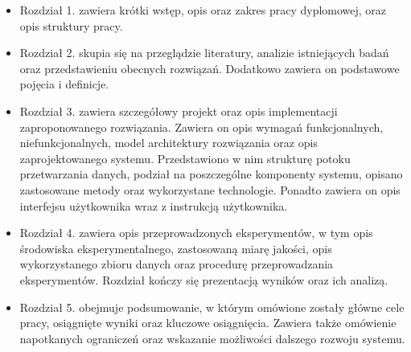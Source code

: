         \begin{itemize}
            \item {
                Rozdział 1. zawiera krótki wstęp, opis oraz zakres pracy dyplomowej, oraz opis struktury pracy.
            }
            \item {
                Rozdział 2. skupia się na przeglądzie literatury, analizie istniejących badań oraz przedstawieniu obecnych rozwiązań. Dodatkowo zawiera on podstawowe pojęcia i definicje.
            }
            \item {
                Rozdział 3. zawiera szczegółowy projekt oraz opis implementacji zaproponowanego rozwiązania. Zawiera on opis wymagań funkcjonalnych, niefunkcjonalnych, model architektury rozwiązania oraz opis zaprojektowanego systemu. Przedstawiono w nim strukturę potoku przetwarzania danych, podział na poszczególne komponenty systemu, opisano zastosowane metody oraz wykorzystane technologie. Ponadto zawiera on opis interfejsu użytkownika wraz z instrukcją użytkownika.    
            }
            \item {
                Rozdział 4. zawiera opis przeprowadzonych eksperymentów, w tym opis środowiska eksperymentalnego, zastosowaną miarę jakości, opis wykorzystanego zbioru danych oraz procedurę przeprowadzania eksperymentów. Rozdział kończy się prezentacją wyników oraz ich analizą.
            }
            \item {
                Rozdział 5. obejmuje podsumowanie, w którym omówione zostały główne cele pracy, osiągnięte wyniki oraz kluczowe osiągnięcia. Zawiera także omówienie napotkanych ograniczeń oraz wskazanie możliwości dalszego rozwoju systemu.
            }
        \end{itemize}
